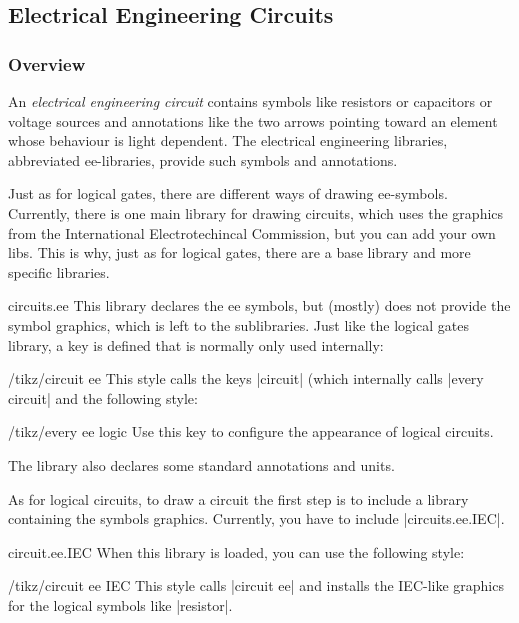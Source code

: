\subsection{Electrical Engineering Circuits}

\subsubsection{Overview}

An \emph{electrical engineering circuit} contains symbols like
resistors or capacitors or voltage sources and annotations like the
two arrows pointing toward an element whose behaviour is light
dependent. The electrical engineering libraries, abbreviated
ee-libraries, provide such symbols and annotations.

Just as for logical gates, there are different ways of drawing
ee-symbols. Currently, there is one main library for drawing circuits,
which uses the graphics from the International Electrotechincal
Commission, but you can add your own libs. This is why, just as for
logical gates, there are a base library and more specific libraries.

\begin{tikzlibrary}{circuits.ee}
  This library declares the ee symbols, but (mostly) does not 
  provide the symbol graphics, which is left to the sublibraries.
  Just like the logical gates library, a key is defined that is
  normally only used internally:
  \begin{key}{/tikz/circuit ee}
    This style calls the keys |circuit| (which internally calls
    |every circuit| and the following style:
    \begin{stylekey}{/tikz/every ee logic}
      Use this key to configure the appearance of logical circuits.      
    \end{stylekey}
  \end{key}

  The library also declares some standard annotations and units. 
\end{tikzlibrary}

As for logical circuits, to draw a circuit the first step is to
include a library containing the symbols graphics. Currently, you have to
include |circuits.ee.IEC|.

\begin{tikzlibrary}{circuit.ee.IEC}
  When this library is loaded, you can use the following style: 
  \begin{key}{/tikz/circuit ee IEC}
    This style calls |circuit ee| and installs the IEC-like
    graphics for the logical symbols like |resistor|.
  \end{key}
\end{tikzlibrary}

